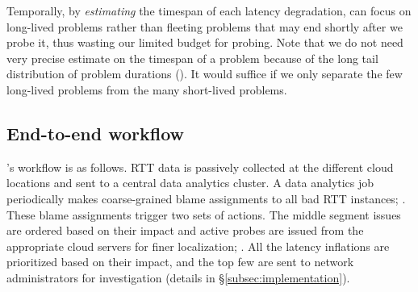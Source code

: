 Temporally, %
by {\em estimating} the timespan of each latency degradation, {\name} can focus on long-lived problems rather than fleeting problems that may end shortly after we probe it, thus wasting our limited budget for probing. Note that we do not need very precise estimate on the timespan of a problem because of the long tail distribution of problem durations (). It would suffice if we only separate the few long-lived problems from the many short-lived problems.%

\subsection{End-to-end workflow} 

{\name}'s workflow is as follows. RTT data is passively collected at the different cloud locations and sent to a central data analytics cluster. %
A data analytics job periodically makes coarse-grained blame assignments to all bad RTT instances; . 
These blame assignments trigger two sets of actions. The middle segment issues are ordered based on their impact and active probes are issued from the appropriate cloud servers for finer localization; . All the latency inflations are prioritized based on their impact, and the top few are sent to network administrators for investigation (details in \S\ref{subsec:implementation}). 


